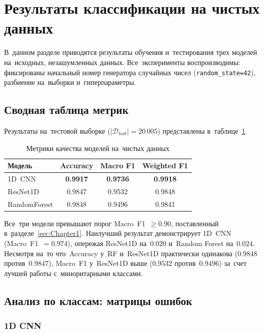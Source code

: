 \section{Результаты классификации на чистых данных}
\label{sec:Chapter3}

В~данном разделе приводятся результаты обучения и~тестирования
трех моделей на~исходных, незашумленных данных.
Все~эксперименты воспроизводимы: фиксированы начальный номер
генератора случайных чисел (\texttt{random\_state=42}),
разбиение на~выборки и~гиперпараметры.

\subsection{Сводная таблица метрик}

Результаты на~тестовой выборке ($|\mathcal{D}_\text{test}| = 20\,005$)
представлены в~таблице~\ref{tab:clean_results}.

\begin{table}[h]
\centering
\caption{Метрики качества моделей на~чистых данных}
\label{tab:clean_results}
\begin{tabular}{lccc}
\hline
\textbf{Модель} & \textbf{Accuracy} & \textbf{Macro F1} & \textbf{Weighted F1} \\
\hline
1D~CNN      & \textbf{0.9917} & \textbf{0.9736} & \textbf{0.9918} \\
ResNet1D    & 0.9847          & 0.9532          & 0.9848          \\
RandomForest & 0.9848         & 0.9496          & 0.9841          \\
\hline
\end{tabular}
\end{table}

Все~три модели превышают порог Macro~F1~$\geq 0.90$,
поставленный в~разделе~\ref{sec:Chapter1}.
Наилучший результат демонстрирует 1D~CNN (Macro~F1~$= 0.974$),
опережая ResNet1D на~$0.020$ и~Random Forest на~$0.024$.
Несмотря на~то что~Accuracy у~RF и~ResNet1D практически одинакова
($0.9848$ против~$0.9847$), Macro~F1 у~ResNet1D выше
($0.9532$ против~$0.9496$) за~счет лучшей работы
с~миноритарными классами.

\subsection{Анализ по классам: матрицы ошибок}

\subsubsection{1D CNN}

